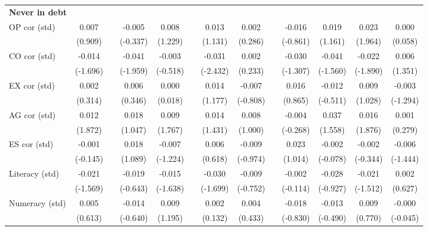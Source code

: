 \begin{table}[htbp]
{\begin{tabular}{lcccccccccccc}
    \midrule
    \textbf{Never in debt} &       &       &       &       &       &       &       &       &       &       &       &  \\
    OP cor (std) & 0.007 &       & -0.005 & 0.008 &       & 0.013 & 0.002 &       & -0.016 & 0.019 & \cellcolor[rgb]{ 1,  1,  0}0.023 & 0.000 \\
          & (0.909) &       & (-0.337) & (1.229) &       & (1.131) & (0.286) &       & (-0.861) & (1.161) & (1.964) & (0.058) \\
    CO cor (std) & \cellcolor[rgb]{ 1,  1,  0}-0.014 &       & \cellcolor[rgb]{ 1,  1,  0}-0.041 & -0.003 &       & \cellcolor[rgb]{ 1,  1,  0}-0.031 & 0.002 &       & -0.030 & -0.041 & \cellcolor[rgb]{ 1,  1,  0}-0.022 & 0.006 \\
          & (-1.696) &       & (-1.959) & (-0.518) &       & (-2.432) & (0.233) &       & (-1.307) & (-1.560) & (-1.890) & (1.351) \\
    EX cor (std) & 0.002 &       & 0.006 & 0.000 &       & 0.014 & -0.007 &       & 0.016 & -0.012 & 0.009 & -0.003 \\
          & (0.314) &       & (0.346) & (0.018) &       & (1.177) & (-0.808) &       & (0.865) & (-0.511) & (1.028) & (-1.294) \\
    AG cor (std) & \cellcolor[rgb]{ 1,  1,  0}0.012 &       & 0.018 & \cellcolor[rgb]{ 1,  1,  0}0.009 &       & 0.014 & 0.008 &       & -0.004 & 0.037 & \cellcolor[rgb]{ 1,  1,  0}0.016 & 0.001 \\
          & (1.872) &       & (1.047) & (1.767) &       & (1.431) & (1.000) &       & (-0.268) & (1.558) & (1.876) & (0.279) \\
    ES cor (std) & -0.001 &       & 0.018 & -0.007 &       & 0.006 & -0.009 &       & 0.023 & -0.002 & -0.002 & -0.006 \\
          & (-0.145) &       & (1.089) & (-1.224) &       & (0.618) & (-0.974) &       & (1.014) & (-0.078) & (-0.344) & (-1.444) \\
    Literacy (std) & -0.021 &       & -0.019 & -0.015 &       & \cellcolor[rgb]{ 1,  1,  0}-0.030 & -0.009 &       & -0.002 & -0.028 & -0.021 & 0.002 \\
          & (-1.569) &       & (-0.643) & (-1.638) &       & (-1.699) & (-0.752) &       & (-0.114) & (-0.927) & (-1.512) & (0.627) \\
    Numeracy (std) & 0.005 &       & -0.014 & 0.009 &       & 0.002 & 0.004 &       & -0.018 & -0.013 & 0.009 & -0.000 \\
          & (0.613) &       & (-0.640) & (1.195) &       & (0.132) & (0.433) &       & (-0.830) & (-0.490) & (0.770) & (-0.045) \\

\end{tabular}}
\end{table}
